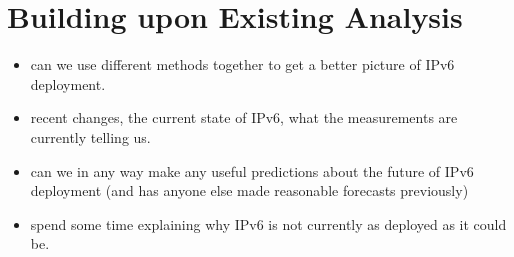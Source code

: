 \section{Building upon Existing Analysis}

\begin{itemize}
    \item can we use different methods together to get a better picture of IPv6
deployment.
    \item recent changes, the current state of IPv6, what the measurements are
currently telling us.
    \item can we in any way make any useful predictions about the future of IPv6
deployment (and has anyone else made reasonable forecasts previously)
    \item spend some time explaining why IPv6 is not currently as deployed as it
could be.
\end{itemize}

